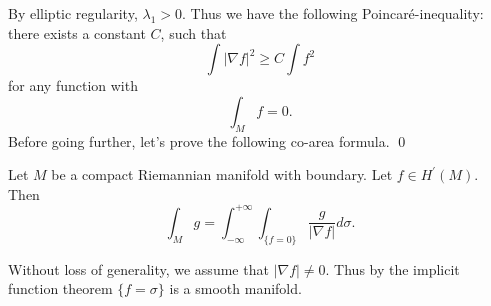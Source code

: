By elliptic regularity, $ \lambda _ 1 > 0 $. Thus we have the following Poincar\'{e}-inequality: there exists a constant $C$, such that 
%
\[\int | \nabla f |^2 \geq C \int f^2 \]
for any function with 
%
\[ \int _M f = 0 .\]
%
Before going further, let's prove the following co-area formula.
\qed

\begin{theorem} Let $M$ be a compact Riemannian manifold with boundary. Let $ f \in H^\prime (M)$. Then 
%
\[ \int _M g = \int ^{+ \infty}_{-\infty} \int _{ \{ f = 0 \}} \frac{g}{| \nabla f |} d \sigma. \]
\end{theorem}

Without loss of generality, we assume that  $ | \nabla f | \neq 0 $. Thus by the implicit function theorem $ \{ f = \sigma \} $ is a smooth manifold. 


